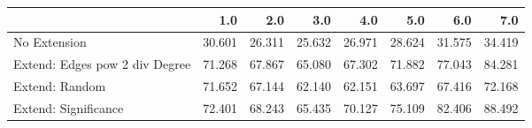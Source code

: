 \begin{tabular}{lrrrrrrr}
\toprule
{} &    1.0 &    2.0 &    3.0 &    4.0 &    5.0 &    6.0 &    7.0 \\
\midrule
No Extension                   & 30.601 & 26.311 & 25.632 & 26.971 & 28.624 & 31.575 & 34.419 \\
Extend: Edges pow 2 div Degree & 71.268 & 67.867 & 65.080 & 67.302 & 71.882 & 77.043 & 84.281 \\
Extend: Random                 & 71.652 & 67.144 & 62.140 & 62.151 & 63.697 & 67.416 & 72.168 \\
Extend: Significance           & 72.401 & 68.243 & 65.435 & 70.127 & 75.109 & 82.406 & 88.492 \\
\bottomrule
\end{tabular}
